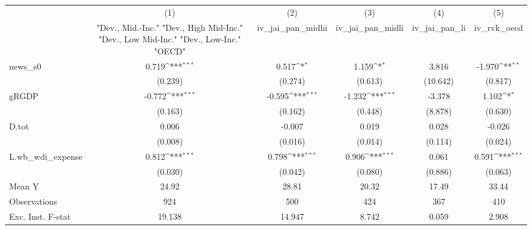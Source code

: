 {
\def\sym#1{\ifmmode^{#1}\else\(^{#1}\)\fi}
\begin{tabular}{l*{5}{c}}
\toprule
            &\multicolumn{1}{c}{(1)}&\multicolumn{1}{c}{(2)}&\multicolumn{1}{c}{(3)}&\multicolumn{1}{c}{(4)}&\multicolumn{1}{c}{(5)}\\
            &\multicolumn{1}{c}{ "Dev., Mid.-Inc." "Dev., High Mid-Inc." "Dev., Low Mid-Inc." "Dev., Low-Inc." "OECD" }&\multicolumn{1}{c}{iv\_jai\_pan\_midhi}&\multicolumn{1}{c}{iv\_jai\_pan\_midli}&\multicolumn{1}{c}{iv\_jai\_pan\_li}&\multicolumn{1}{c}{iv\_rvk\_oecd}\\
\midrule
news\_s0     &       0.719\sym{***}&       0.517\sym{*}  &       1.159\sym{*}  &       3.816         &      -1.970\sym{**} \\
            &     (0.239)         &     (0.274)         &     (0.613)         &    (10.642)         &     (0.817)         \\
\addlinespace
gRGDP       &      -0.772\sym{***}&      -0.595\sym{***}&      -1.232\sym{***}&      -3.378         &       1.102\sym{*}  \\
            &     (0.163)         &     (0.162)         &     (0.448)         &     (8.878)         &     (0.630)         \\
\addlinespace
D.tot       &       0.006         &      -0.007         &       0.019         &       0.028         &      -0.026         \\
            &     (0.008)         &     (0.016)         &     (0.014)         &     (0.114)         &     (0.024)         \\
\addlinespace
L.wb\_wdi\_expense&       0.812\sym{***}&       0.798\sym{***}&       0.906\sym{***}&       0.061         &       0.591\sym{***}\\
            &     (0.030)         &     (0.042)         &     (0.080)         &     (0.886)         &     (0.063)         \\
\midrule
Mean Y      &       24.92         &       28.81         &       20.32         &       17.49         &       33.44         \\
Observations&         924         &         500         &         424         &         367         &         410         \\
Exc. Inst. F-stat&      19.138         &      14.947         &       8.742         &       0.059         &       2.908         \\
\bottomrule
\end{tabular}
}
